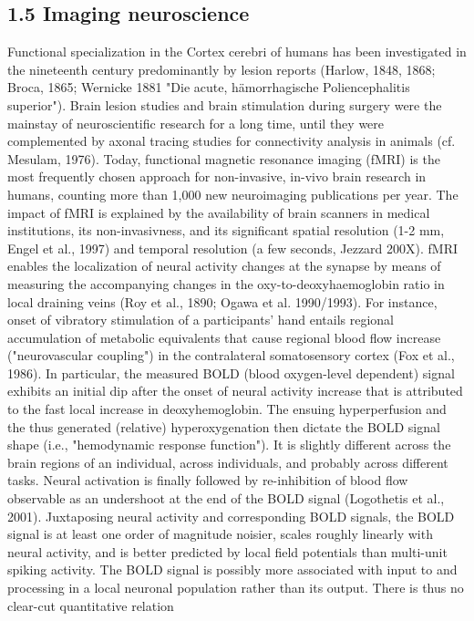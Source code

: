 \documentclass[authoryear,review,3p]{elsarticle}
\begin{document}
\subsection*{1.5 Imaging neuroscience}
Functional specialization in the Cortex cerebri of humans has been
investigated in the nineteenth
century predominantly by lesion reports
(Harlow, 1848, 1868; Broca, 1865;
Wernicke 1881 "Die acute, hämorrhagische Poliencephalitis superior").
Brain lesion studies and brain stimulation during surgery were the mainstay of
neuroscientific research for a long time,
until they were complemented by
axonal tracing studies for connectivity analysis in
animals (cf. Mesulam, 1976).
%
Today, functional magnetic resonance imaging (fMRI)
is the most frequently chosen approach for non-invasive,
in-vivo brain research in humans,
counting more than 1,000 new neuroimaging publications per year.
The impact of fMRI is explained by the availability
of brain scanners in medical institutions,
its non-invasivness,
and its significant spatial resolution (1-2 mm, Engel et al., 1997)
and temporal resolution (a few seconds, Jezzard 200X).
%
fMRI enables the localization of neural activity changes at the synapse by
means of measuring the accompanying changes in
the oxy-to-deoxyhaemoglobin ratio in local draining veins
(Roy et al., 1890; Ogawa et al. 1990/1993).
For instance, onset of vibratory stimulation of a participants' hand
entails regional accumulation of metabolic equivalents that cause
regional blood flow increase ("neurovascular coupling") in the
contralateral somatosensory cortex (Fox et al., 1986).
%
In particular,
the measured BOLD (blood oxygen-level dependent) signal exhibits
an initial dip after the onset of neural activity
increase that is attributed to the fast local increase
in deoxyhemoglobin.
The ensuing hyperperfusion and the
thus generated (relative) hyperoxygenation then dictate
the BOLD signal shape (i.e., "hemodynamic response function").
It is slightly different across the brain regions of an individual,
across individuals, and probably across different tasks.
Neural activation is finally followed by re-inhibition of
blood flow observable as an undershoot at the
end of the BOLD signal (Logothetis et al., 2001).
%
Juxtaposing neural activity and corresponding BOLD signals,
the BOLD signal is at least one order of magnitude noisier,
scales roughly linearly with neural activity, and
is better predicted by local field potentials than
multi-unit spiking activity. The BOLD signal is possibly more associated
with input to and processing in a local neuronal population
rather than its output. There is thus no clear-cut quantitative relation
\end{document}
